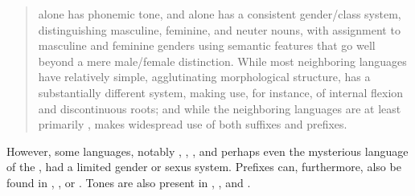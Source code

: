 \begin{quote}
 alone has phonemic tone, and  alone has a consistent gender/class system, distinguishing masculine, feminine, and neuter nouns, with assignment to masculine and feminine genders using semantic features that go well beyond a mere male/female distinction. While most neighboring languages have relatively simple, agglutinating morphological structure,  has a substantially different system, making use, for instance, of internal flexion and discontinuous roots; and while the neighboring languages are at least primarily ,  makes widespread use of both suffixes and prefixes.
\end{quote}

\noindent However, some languages, notably , , , and perhaps even the mysterious language of the  \citep{Vovin2004}, had a limited gender or sexus system. Prefixes can, furthermore, also be found in , , or . Tones are also present in , , and .


